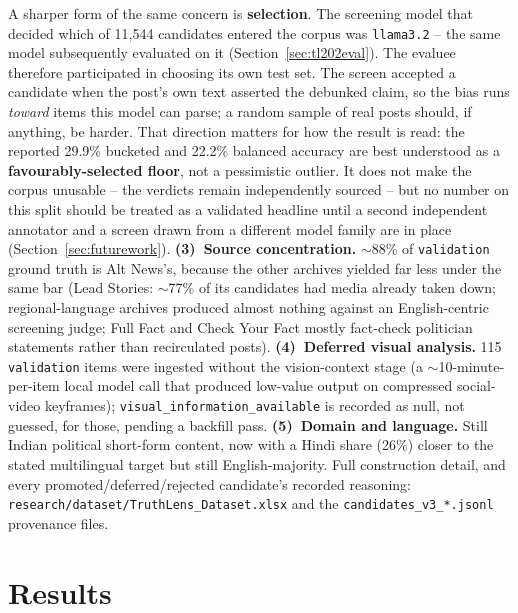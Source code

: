 \documentclass[conference]{IEEEtran}
\begin{document}
A sharper form of the same concern is \textbf{selection}. The screening
model that decided which of 11{,}544 candidates entered the corpus was
\texttt{llama3.2} -- the same model subsequently evaluated on it
(Section~\ref{sec:tl202eval}). The evaluee therefore participated in
choosing its own test set. The screen accepted a candidate when the
post's own text asserted the debunked claim, so the bias runs
\emph{toward} items this model can parse; a random sample of real posts
should, if anything, be harder. That direction matters for how the
result is read: the reported 29.9\% bucketed and 22.2\% balanced
accuracy are best understood as a \textbf{favourably-selected floor},
not a pessimistic outlier. It does not make the corpus unusable -- the
verdicts remain independently sourced -- but no number on this split
should be treated as a validated headline until a second independent
annotator and a screen drawn from a different model family are in place
(Section~\ref{sec:futurework}). \textbf{(3)~Source concentration.}
$\sim$88\% of \texttt{validation} ground truth is Alt News's, because the
other archives yielded far less under the same bar (Lead Stories: $\sim$77\%
of its candidates had media already taken down; regional-language
archives produced almost nothing against an English-centric screening
judge; Full Fact and Check Your Fact mostly fact-check politician
statements rather than recirculated posts). \textbf{(4)~Deferred
visual analysis.} 115 \texttt{validation} items were ingested without the
vision-context stage (a $\sim$10-minute-per-item local model call that
produced low-value output on compressed social-video keyframes);
\texttt{visual\_information\_available} is recorded as null, not guessed,
for those, pending a backfill pass. \textbf{(5)~Domain and language.}
Still Indian political short-form content, now with a Hindi share
(26\%) closer to the stated multilingual target but still English-majority.
Full construction detail, and every promoted/deferred/rejected
candidate's recorded reasoning:
\texttt{research/dataset/TruthLens\_Dataset.xlsx} and the
\texttt{candidates\_v3\_*.jsonl} provenance files.

\section{Results}
\label{sec:results}
\end{document}
